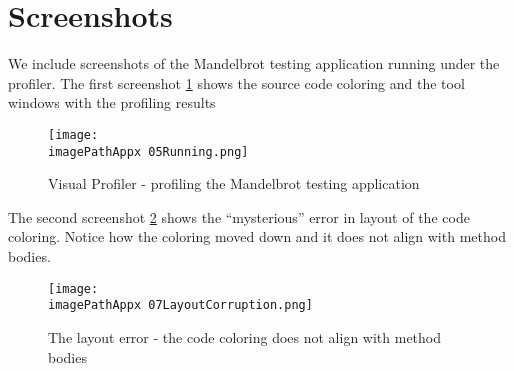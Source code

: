 \section{Screenshots}
We include screenshots of the Mandelbrot testing application running under the profiler. The first screenshot \ref{fig:0905Running} shows the source code coloring and the tool windows with the profiling results

\begin{figure}[H]
	\centering
		\texttt{[image: \\imagePathAppx 05Running.png]}
		\caption{Visual Profiler - profiling the Mandelbrot testing application}
	\label{fig:0905Running}
\end{figure}

The second screenshot \ref{fig:0907LayoutCorruption} shows the ``mysterious'' error in layout of the code coloring. Notice how the coloring moved down and it does not align with method bodies. 

\begin{figure}[H]
	\centering
		\texttt{[image: \\imagePathAppx 07LayoutCorruption.png]}
		\caption{The layout error - the code coloring does not align with method bodies }
	\label{fig:0907LayoutCorruption}
\end{figure}


